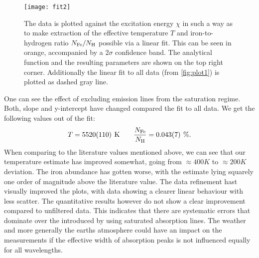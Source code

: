 \begin{figure}[H]
	\centering
	\texttt{[image: fit2]}
	\caption{The data is plotted against the excitation energy $\chi$ in such a way as to make extraction of the effective temperature $T$ and iron-to-hydrogen ratio $N_{\text{Fe}}/N_{\text{H}}$ possible via a linear fit. This can be seen in orange, accompanied by a $2\sigma$ confidence band. The analytical function and the resulting parameters are shown on the top right corner. Additionally the linear fit to all data (from \autoref{fig:plot1}) is plotted as dashed gray line.}
	\label{fig:plot4}
\end{figure}

One can see the effect of excluding emission lines from the saturation regime. Both, slope and y-intercept have changed compared the fit to all data. We get the following values out of the fit:
\[ T = 5520(110) \unit{K} \qquad \frac{\NFe}{\NH} = 0.043(7) \unit{\percent}. \]
When comparing to the literature values mentioned above, we can see that our temperature estimate has improved somewhat, going from $\approx 400 \unit{K}$ to $\approx 200 \unit{K}$ deviation. The iron abundance has gotten worse, with the estimate lying squarely one order of magnitude above the literature value. The data refinement hast visually improved the plots, with data showing a clearer linear behaviour with less scatter. The quantitative results however do not show a clear improvement compared to unfiltered data. This indicates that there are systematic errors that dominate over the introduced by using saturated absorption lines. The weather and more generally the earths atmosphere could have an impact on the measurements if the effective width of absorption peaks is not influenced equally for all wavelengths. 